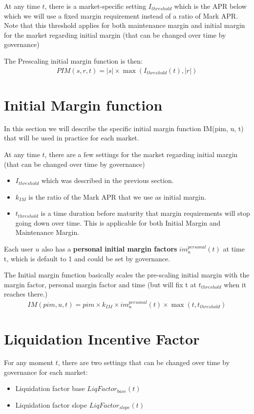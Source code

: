 \documentclass{article}%
\begin{document}
\begin{appendices}
At any time $t$, there is a market-specific setting $I_{threshold}$ which is the APR below which we will use a fixed margin requirement instead of a ratio of Mark APR. Note that this threshold applies for both maintenance margin and initial margin for the market regarding initial margin (that can be changed over time by governance)

The Prescaling initial margin function is then:
\begin{align}
    PIM(s, r, t) = |s| \times \max(I_{threshold}(t), |r|)
\end{align}

\section{Initial Margin function}
In this section we will describe the specific initial margin function IM(pim, u, t) that will be used in practice for each market.

At any time $t$, there are a few settings for the market regarding initial margin (that can be changed over time by governance)
\begin{itemize}
    \item $I_{threshold}$ which was described in the previous section.
    \item $k_{IM}$ is the ratio of the Mark APR that we use as initial margin.
    \item $t_{threshold}$ is a time duration before maturity that margin requirements will stop going down over time. This is applicable for both Initial Margin and Maintenance Margin.
\end{itemize}

Each user $u$ also has a \textbf{personal initial margin factors} $im_{u}^{personal}(t)$ at time t, which is default to 1 and could be set by governance.

The Initial margin function basically scales the pre-scaling initial margin with the margin factor, personal margin factor and time (but will fix t at $t_{threshold}$ when it reaches there.)
\begin{align}
    IM(pim, u, t) = pim \times k_{IM} \times im_{u}^{personal}(t) \times \max(t, t_{threshold})
\end{align}

\section{Liquidation Incentive Factor}
For any moment $t$, there are two settings that can be changed over time by governance for each market:
\begin{itemize}
    \item Liquidation factor base $LiqFactor_{base}(t)$
    \item Liquidation factor slope $LiqFactor_{slope}(t)$
\end{itemize}
 

\end{appendices}
\end{document}
